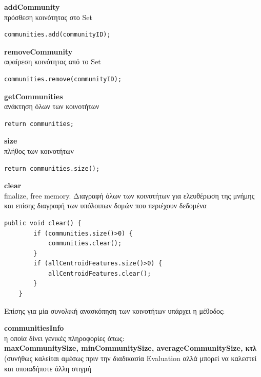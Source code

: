 \begin{description}
\item \textbf{addCommunity}  \hfill \\
  πρόσθεση κοινότητας στο Set
\begin{lstlisting}[frame=single] 
  communities.add(communityID);
\end{lstlisting}
\item \textbf{removeCommunity}  \hfill \\
  αφαίρεση κοινότητας από το Set
\begin{lstlisting}[frame=single]
  communities.remove(communityID);
\end{lstlisting}
\item \textbf{getCommunities}   \hfill \\
  ανάκτηση όλων των κοινοτήτων
\begin{lstlisting}[frame=single] 
  return communities;
\end{lstlisting}
\item \textbf{size}   \hfill \\
  πλήθος των κοινοτήτων
\begin{lstlisting}[frame=single]
  return communities.size();
\end{lstlisting}
\item \textbf{clear}   \hfill \\
  finalize, free memory. Διαγραφή όλων των κοινοτήτων για ελευθέρωση της μνήμης και επίσης διαγραφή των υπόλοιπων δομών που περιέχουν δεδομένα
\begin{lstlisting}[frame=single] 
    public void clear() {
        if (communities.size()>0) {
            communities.clear();
        }
        if (allCentroidFeatures.size()>0) {
            allCentroidFeatures.clear();
        }
    }
\end{lstlisting}  
\end{description}  
  
Επίσης για μία συνολική ανασκόπηση των κοινοτήτων υπάρχει η μέθοδος:  
\begin{description}  
\item \textbf{communitiesInfo}   \hfill \\
  η οποία δίνει γενικές πληροφορίες όπως:\\
  \textbf{maxCommunitySize, minCommunitySize, averageCommunitySize, κτλ}\\
  (συνήθως καλείται αμέσως πριν την διαδικασία Evaluation αλλά μπορεί να καλεστεί και οποιαδήποτε άλλη στιγμή
\end{description}


